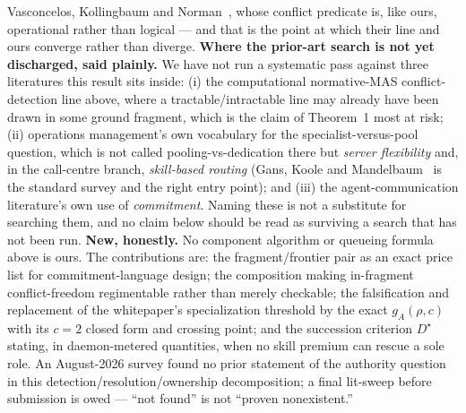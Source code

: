\documentclass[11pt,a4paper]{article}
\begin{document}
Vasconcelos, Kollingbaum and Norman~\cite{vkn09}, whose conflict predicate is, like ours, operational rather than logical --- and
that is the point at which their line and ours converge rather than diverge. \textbf{Where the prior-art search is not yet
discharged, said plainly.} We have not run a systematic pass against three literatures this result sits inside: (i) the
computational normative-MAS conflict-detection line above, where a tractable/intractable line may already have been drawn in some
ground fragment, which is the claim of Theorem~1 most at risk; (ii) operations management's own vocabulary for the
specialist-versus-pool question, which is not called pooling-vs-dedication there but \emph{server flexibility} and, in the
call-centre branch, \emph{skill-based routing} (Gans, Koole and Mandelbaum~\cite{gkm03} is the standard survey and the right
entry point); and (iii) the agent-communication literature's own use of \emph{commitment}. Naming these is not a substitute for
searching them, and no claim below should be read as surviving a search that has not been run. \textbf{New, honestly.} No component algorithm or queueing formula above is ours. The
contributions are: the fragment/frontier pair as an exact price list for commitment-language design; the composition making
in-fragment conflict-freedom regimentable rather than merely checkable; the falsification and replacement of the whitepaper's
specialization threshold by the exact $g_A(\rho,c)$ with its $c{=}2$ closed form and crossing point; and the succession criterion
$D^\star$ stating, in daemon-metered quantities, when no skill premium can rescue a sole role. An August-2026 survey found no
prior statement of the authority question in this detection/resolution/ownership decomposition; a final lit-sweep before
submission is owed --- ``not found'' is not ``proven nonexistent.''
\end{document}
